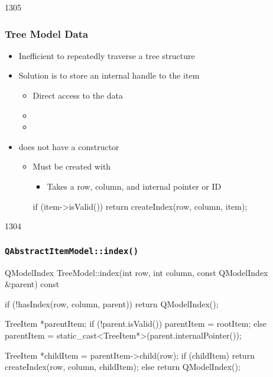 \begin{slide}[fragile]{1305}\frametitle{Tree Model Data}
  \begin{itemize}
  \item Inefficient to repeatedly traverse a tree structure
  \item Solution is to store an internal handle to the item
    \begin{itemize}
    \item Direct access to the data
    \item {}
    \item {}
    \end{itemize}
  \item {} does not have a constructor
    \begin{itemize}
    \item Must be created with 
      \begin{itemize}
      \item Takes a row, column, and internal pointer or ID
      \end{itemize}
      \begin{cpp}
if (item->isValid()) {
    return createIndex(row, column, item);
}
      \end{cpp}
    \end{itemize}
  \end{itemize}
\end{slide}

\begin{slide}[fragile]{1304}
  \frametitle{\textbf{\texttt{QAbstractItemModel::index()}}}
  \begin{cpp}
QModelIndex TreeModel::index(int row, int column,
                             const QModelIndex &parent) const
{
    if (!hasIndex(row, column, parent)) return QModelIndex();

    TreeItem *parentItem;
    if (!parent.isValid())
        parentItem = rootItem;
    else
        parentItem = static_cast<TreeItem*>(parent.internalPointer());

    TreeItem *childItem = parentItem->child(row);
    if (childItem)
        return createIndex(row, column, childItem);
    else
        return QModelIndex();
}
  \end{cpp}
\end{slide}

